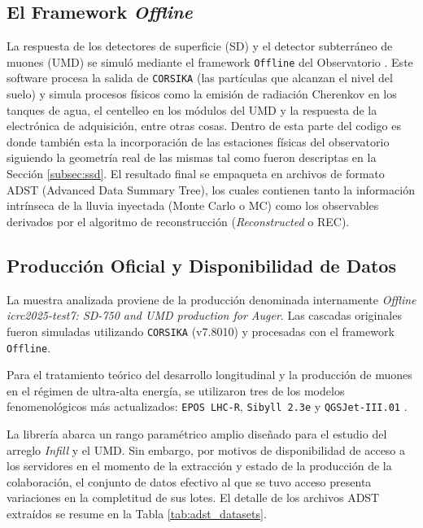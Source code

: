 \subsection{El Framework \textit{Offline}}
La respuesta de los detectores de superficie (SD) y el detector subterráneo de muones (UMD) se simuló mediante el framework \texttt{Offline} del Observatorio \cite{argiro2007offline}. Este software procesa la salida de \texttt{CORSIKA} (las partículas que alcanzan el nivel del suelo) y simula procesos físicos como la emisión de radiación Cherenkov en los tanques de agua, el centelleo en los módulos del UMD y la respuesta de la electrónica de adquisición, entre otras cosas. Dentro de esta parte del codigo es donde también esta la incorporación de las estaciones físicas del observatorio siguiendo la geometría real de las mismas tal como fueron descriptas en la Sección \ref{subsec:ssd}. El resultado final se empaqueta en archivos de formato ADST (Advanced Data Summary Tree), los cuales contienen tanto la información intrínseca de la lluvia inyectada (Monte Carlo o MC) como los observables derivados por el algoritmo de reconstrucción (\textit{Reconstructed} o REC).

\subsection{Producción Oficial y Disponibilidad de Datos}
\label{sec:produccion_mc}

La muestra analizada proviene de la producción denominada internamente \textit{Offline icrc2025-test7: SD-750 and UMD production for Auger}. Las cascadas originales fueron simuladas utilizando \texttt{CORSIKA} (v7.8010) y procesadas con el framework \texttt{Offline}.

Para el tratamiento teórico del desarrollo longitudinal y la producción de muones en el régimen de ultra-alta energía, se utilizaron tres de los modelos fenomenológicos más actualizados: \texttt{EPOS LHC-R}, \texttt{Sibyll 2.3e} y \texttt{QGSJet-III.01} \cite{ostapchenko2024qgsjetiiimodelhighenergy}.

La librería abarca un rango paramétrico amplio diseñado para el estudio del arreglo \textit{Infill} y el UMD. Sin embargo, por motivos de disponibilidad de acceso a los servidores en el momento de la extracción y estado de la producción de la colaboración, el conjunto de datos efectivo al que se tuvo acceso presenta variaciones en la completitud de sus lotes. El detalle de los archivos ADST extraídos se resume en la Tabla \ref{tab:adst_datasets}.

